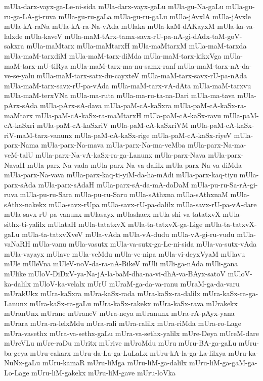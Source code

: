 {mUla-darx-vayx-ga-Le-ni-sida
mUla-darx-vayx-gaLu
mUla-gu-Na-gaLu
mUla-gu-ru-ga-LA-gi-ruva
mUla-gu-ru-gaLa
mUla-gu-ru-gaLu
mUla-jAvxlA
mUla-jAvxle
mUla-kA-raNa
mUla-kA-ra-Na-vAda
mUlaka
mUla-kaM-dAKayxM
mUla-ka-va-lalxde
mUla-kaveV
mUla-maM-tArx-tamx-savx-rU-pa-nA-gi-dAdx-taM-goV-sakxra
mUla-maMtarx
mUla-maMtarxH
mUla-maMtarxM
mUla-maM-tarxda
mUla-maM-tarxdiM
mUla-maM-tarx-diMda
mUla-maM-tarx-kikxVga
mUla-maM-tarx-mU-tiRya
mUla-maM-tarx-ma-nu-samx-ranf
mUla-maM-tarx-nA-da-ve-se-yalu
mUla-maM-tarx-satx-du-cayxteV
mUla-maM-tarx-savx-rU-pa-nAda
mUla-maM-tarx-savx-rU-pa-vAda
mUla-maM-tarx-vA-dAta
mUla-maM-tarxvu
mUla-maM-terxVNa
mUla-ma-ruta
mUla-ma-ru-ta-na-Dari
mUla-ma-tava
mUla-pArx-sAda
mUla-pArx-sA-dava
mUla-paM-cA-kaSxra
mUla-paM-cA-kaSx-ra-maMtarx
mUla-paM-cA-kaSx-ra-maMtarxH
mUla-paM-cA-kaSx-ravu
mUla-paM-cA-kaSxri
mUla-paM-cA-kaSxriV
mUla-paM-cA-kaSxriVM
mUla-paM-cA-kaSx-riV-maM-tarx-vanunx
mUla-paM-cA-kaSx-rige
mUla-paM-cA-kaSx-riyeV
mUla-parx-Nama
mUla-parx-Na-mava
mUla-parx-Na-ma-veMba
mUla-parx-Na-ma-veM-talU
mUla-parx-Na-vA-kaSx-ra-ga-Lanunx
mUla-parx-Nava
mUla-parx-NavaH
mUla-parx-Na-vada
mUla-parx-Na-va-dalilx
mUla-parx-Na-va-diMda
mUla-parx-Na-vava
mUla-parx-kaq-ti-yiM-da-ha-mAdi
mUla-parx-kaq-tiyu
mUla-parx-sAda
mUla-parx-sAdaH
mUla-parx-sA-da-mA-doDaM
mUla-pu-ru-Sa-rA-gi-ruva
mUla-pu-ru-Sara
mUla-pu-ru-Saru
mUla-sAthxna
mUla-sAthxnaM
mUla-sAthx-nakekx
mUla-savx-rUpa
mUla-savx-rU-pa-dalilx
mUla-savx-rU-pa-vA-dare
mUla-savx-rU-pa-vanunx
mUlasayx
mUlashacx
mUla-shi-va-tatatxvX
mUla-sithx-ti-yalilx
mUlataH
mUla-tatatxvX
mUla-ta-tatxvX-ga-Lige
mUla-ta-tatxvX-gaLu
mUla-ta-tatxvXveV
mUla-vAda
mUla-vA-dudu
mUla-vA-gi-ru-vudu
mUla-vaNaRH
mUla-vanu
mUla-vasutx
mUla-va-sutx-ga-Le-ni-sida
mUla-va-sutx-vAda
mUla-vayayx
mUlave
mUla-veMdu
mUla-ve-nipa
mUla-vi-deyxVyaM
mUlavu
mUle
mUleVna
mUleV-noV-da-ra-nA-BikeV
mUli
mUli-ga-nAda
mUli-gana
mUlike
mUloV-DiDxV-ya-Na-jA-la-baM-dha-na-vi-dhA-va-BAyx-satoV
mUloV-ka-dalilx
mUloV-ka-velalx
mUrU
mUraM-ga-da-va-ranu
mUraM-ga-da-varu
mUrakUkx
mUra-kaSxra
mUra-kaSx-rada
mUra-kaSx-ra-dalilx
mUra-kaSx-ra-ga-Lanunx
mUra-kaSx-ra-gaLu
mUra-kaSx-rakekx
mUra-kaSx-rava
mUrakekx
mUranUnx
mUrane
mUraneV
mUra-neya
mUranunx
mUra-rA-pAyx-yana
mUrara
mUra-ra-lelxMdu
mUra-rali
mUra-ralilx
mUra-riMda
mUra-ro-Lage
mUra-vasethx
mUra-va-sethx-gaLu
mUra-va-sethx-yalilx
mUre-Deya
mUreM-dare
mUreVLu
mUre-raDu
mUritx
mUrive
mUroMdu
mUru
mUru-BA-ga-gaLu
mUru-ba-geya
mUru-cakarx
mUru-da-La-ga-LuLaLx
mUru-kA-la-ga-La-lilxya
mUru-ka-NuNx-gaLu
mUru-kamaR
mUru-liMga
mUru-liM-ga-dalilx
mUru-liM-ga-gaM-ga-Lo-Lage
mUru-liM-gakekx
mUru-liM-gave
mUru-loVka
}
